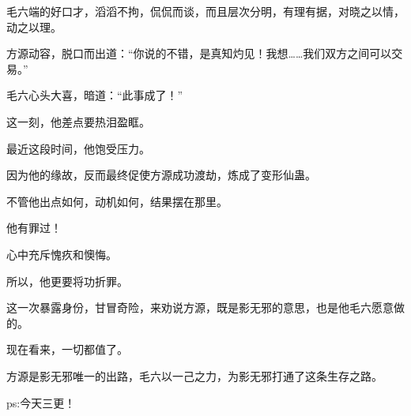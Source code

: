 \begin{this_body}
毛六端的好口才，滔滔不拘，侃侃而谈，而且层次分明，有理有据，对晓之以情，动之以理。

方源动容，脱口而出道：“你说的不错，是真知灼见！我想……我们双方之间可以交易。”

毛六心头大喜，暗道：“此事成了！”

这一刻，他差点要热泪盈眶。

最近这段时间，他饱受压力。

因为他的缘故，反而最终促使方源成功渡劫，炼成了变形仙蛊。

不管他出点如何，动机如何，结果摆在那里。

他有罪过！

心中充斥愧疚和懊悔。

所以，他更要将功折罪。

这一次暴露身份，甘冒奇险，来劝说方源，既是影无邪的意思，也是他毛六愿意做的。

现在看来，一切都值了。

方源是影无邪唯一的出路，毛六以一己之力，为影无邪打通了这条生存之路。

ps:今天三更！

\end{this_body}

